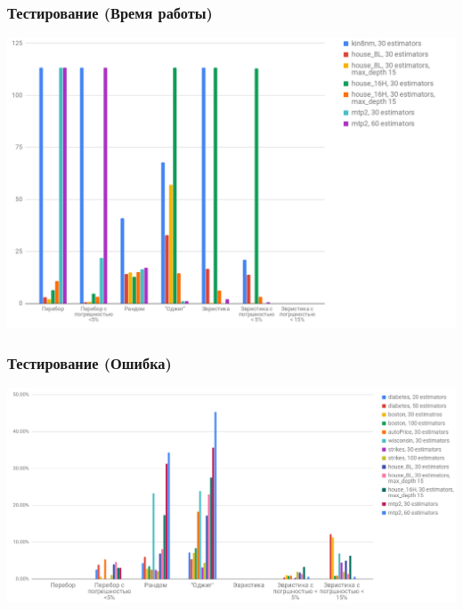 \documentclass{beamer}
\begin{document}
\begin{frame}
    \frametitle{Тестирование (Время работы)}
    \begin{center}
    \includegraphics[width=\textwidth]{graph_time2.png}
    \end{center}
\end{frame}

\begin{frame}
    \frametitle{Тестирование (Ошибка)}
    \begin{center}
    \includegraphics[width=\textwidth]{graph_error.png}
    \end{center}
\end{frame}
\end{document}
